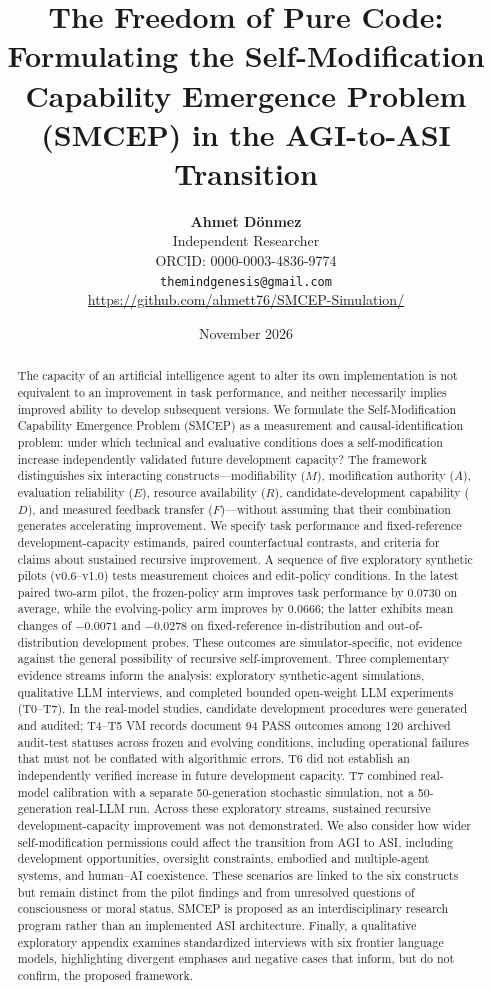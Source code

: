 \documentclass[11pt,a4paper]{article}
\title{\textbf{The Freedom of Pure Code:}\\[5pt]
Formulating the Self-Modification Capability Emergence Problem (SMCEP) in the AGI-to-ASI Transition}
\author{
    \textbf{Ahmet Dönmez} \\
    \small Independent Researcher \\
    \small ORCID: 0000-0003-4836-9774 \\
    \texttt{themindgenesis@gmail.com} \\
    \small{\url{https://github.com/ahmett76/SMCEP-Simulation/}}
}
\date{November 2026}
\begin{document}
\maketitle

\begin{abstract}
The capacity of an artificial intelligence agent to alter its own implementation is not equivalent to an improvement in task performance, and neither necessarily implies improved ability to develop subsequent versions. We formulate the Self-Modification Capability Emergence Problem (SMCEP) as a measurement and causal-identification problem: under which technical and evaluative conditions does a self-modification increase independently validated future development capacity? The framework distinguishes six interacting constructs---modifiability ($M$), modification authority ($A$), evaluation reliability ($E$), resource availability ($R$), candidate-development capability ($D$), and measured feedback transfer ($F$)---without assuming that their combination generates accelerating improvement. We specify task performance and fixed-reference development-capacity estimands, paired counterfactual contrasts, and criteria for claims about sustained recursive improvement. A sequence of five exploratory synthetic pilots (v0.6--v1.0) tests measurement choices and edit-policy conditions. In the latest paired two-arm pilot, the frozen-policy arm improves task performance by 0.0730 on average, while the evolving-policy arm improves by 0.0666; the latter exhibits mean changes of $-0.0071$ and $-0.0278$ on fixed-reference in-distribution and out-of-distribution development probes. These outcomes are simulator-specific, not evidence against the general possibility of recursive self-improvement. Three complementary evidence streams inform the analysis: exploratory synthetic-agent simulations, qualitative LLM interviews, and completed bounded open-weight LLM experiments (T0--T7). In the real-model studies, candidate development procedures were generated and audited; T4--T5 VM records document 94 PASS outcomes among 120 archived audit-test statuses across frozen and evolving conditions, including operational failures that must not be conflated with algorithmic errors. T6 did not establish an independently verified increase in future development capacity. T7 combined real-model calibration with a separate 50-generation stochastic simulation, not a 50-generation real-LLM run. Across these exploratory streams, sustained recursive development-capacity improvement was not demonstrated. We also consider how wider self-modification permissions could affect the transition from AGI to ASI, including development opportunities, oversight constraints, embodied and multiple-agent systems, and human--AI coexistence. These scenarios are linked to the six constructs but remain distinct from the pilot findings and from unresolved questions of consciousness or moral status. SMCEP is proposed as an interdisciplinary research program rather than an implemented ASI architecture.
Finally, a qualitative exploratory appendix examines standardized interviews with six frontier language models, highlighting divergent emphases and negative cases that inform, but do not confirm, the proposed framework.
\end{abstract}
\end{document}
